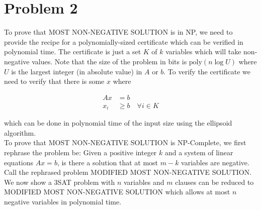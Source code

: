 \section*{Problem 2}

To prove that MOST NON-NEGATIVE SOLUTION is in NP, we need to provide the recipe for a polynomially-sized certificate which can be verified in polynomial time. The certificate is just a set $K$ of $k$ variables which will take non-negative values. Note that the size of the problem in bits is $\text{poly}(n \log U)$ where $U$ is the largest integer (in absolute value) in $A$ or $b$. To verify the certificate we need to verify that there is some $x$ where 

\begin{align*}
Ax &= b\\
x_i &\geq b \quad \forall i \in K
\end{align*}

which can be done in polynomial time of the input size using the ellipsoid algorithm.\\

To prove that MOST NON-NEGATIVE SOLUTION is NP-Complete, we first rephrase the problem be: Given a positive integer $k$ and a system of linear equations $Ax = b$, is there a solution that at most $m-k$ variables are negative. Call the rephrased problem MODIFIED MOST NON-NEGATIVE SOLUTION. We now show a 3SAT problem with $n$ variables and $m$ clauses can be reduced to MODIFIED MOST NON-NEGATIVE SOLUTION which allows at most $n$ negative variables in polynomial time.\\

